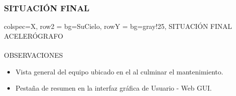 \subsubsection{SITUACIÓN FINAL}
\begin{tblr}{
    colspec={X},
    row{2} = {bg=SuCielo},
    row{Y} = {bg=gray!25},
}
    SITUACIÓN FINAL \\
    ACELERÓGRAFO \MakeUppercase{} \\
     \\
    OBSERVACIONES \\
    \begin{itemize}
        \item Vista general del equipo ubicado en el  al culminar el mantenimiento.
        \item Pestaña de resumen en la interfaz gráfica de Usuario - Web GUI.
    \end{itemize}
\end{tblr}
